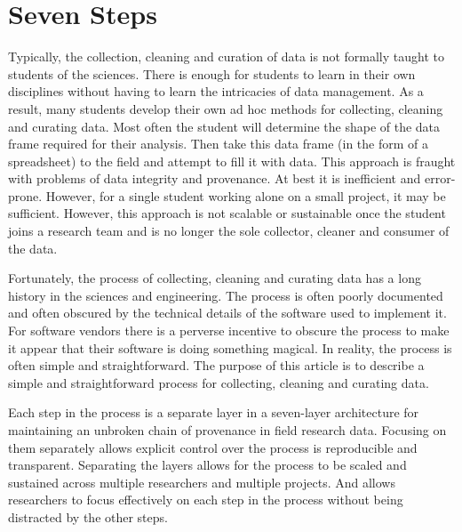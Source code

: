 \documentclass[12pt,a4paper]{article}
\title{\documenttitle}
\subtitle{A Seven-Layer Architecture for Maintaining an Unbroken Chain of Provenance in Field Research}
\author{\authorname}
\date{\today}
\begin{document}
\maketitle

\begin{abstract}
  Write a concise summary of the article here.
\end{abstract}

\tableofcontents

\section{Seven Steps}

Typically,
the collection, cleaning and curation of data is not formally taught
to students of the sciences.
There is enough for students to learn in their own disciplines
without having to learn the intricacies of data management.
As a result, many students develop their own ad hoc methods for
collecting, cleaning and curating data.
Most often
the student will determine the shape of the data frame required for their analysis.
Then take this data frame
(in the form of a spreadsheet)
to the field and attempt to fill it with data.
This approach is fraught with problems of data integrity and provenance.
At best it is inefficient and error-prone.
However,
for a single student working alone on a small project,
it may be sufficient.
However, this approach is
not scalable or sustainable
once the student joins a research team
and is no longer the sole collector, cleaner and consumer of the data.

Fortunately, the process of collecting, cleaning and curating data
has a long history in the sciences and engineering.
The process is often poorly documented
and often obscured by the technical details of the software used to implement it.
For software vendors there is a perverse incentive to obscure the process
to make it appear that their software is doing something magical.
In reality, the process is often simple and straightforward.
The purpose of this article is to describe a simple and straightforward process
for collecting, cleaning and curating data.

Each step in the process is a separate layer in a seven-layer architecture
for maintaining an unbroken chain of provenance in field research data.
Focusing on them separately allows explicit control over the process
is reproducible and transparent.
Separating the layers allows for the process to be scaled and sustained
across multiple researchers and multiple projects.
And allows researchers to focus effectively on each step in the process
without being distracted by the other steps.
\end{document}
